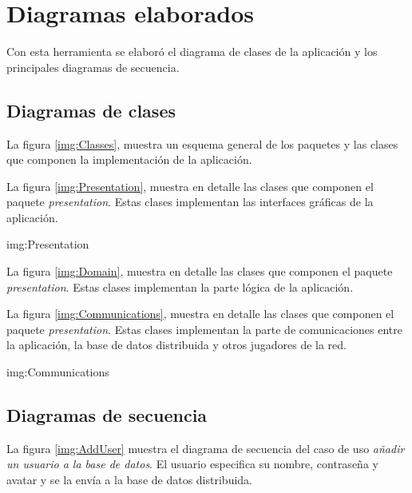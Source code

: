 \section{Diagramas elaborados}
Con esta herramienta se elaboró el diagrama de clases de la aplicación y los
principales diagramas de secuencia.

\subsection{Diagramas de clases}
La figura \ref{img:Classes}, muestra un esquema general de los paquetes y
las clases que componen la implementación de la aplicación.

\begin{sidewaysfigure}
\end{sidewaysfigure}

La figura \ref{img:Presentation}, muestra en detalle las clases que componen el
paquete \emph{presentation}. Estas clases implementan las interfaces gráficas
de la aplicación.

{img:Presentation}

La figura \ref{img:Domain}, muestra en detalle las clases que componen el
paquete \emph{presentation}. Estas clases implementan la parte lógica de la
aplicación.


La figura \ref{img:Communications}, muestra en detalle las clases que componen
el paquete \emph{presentation}. Estas clases implementan la parte de
comunicaciones entre la aplicación, la base de datos distribuida y otros
jugadores de la red.

{img:Communications}

\subsection{Diagramas de secuencia}
La figura \ref{img:AddUser} muestra el diagrama de secuencia del caso de uso
\emph{añadir un usuario a la base de datos}. El usuario especifica su nombre,
contraseña y avatar y se la envía a la base de datos distribuida.

\begin{sidewaysfigure}
\end{sidewaysfigure}

